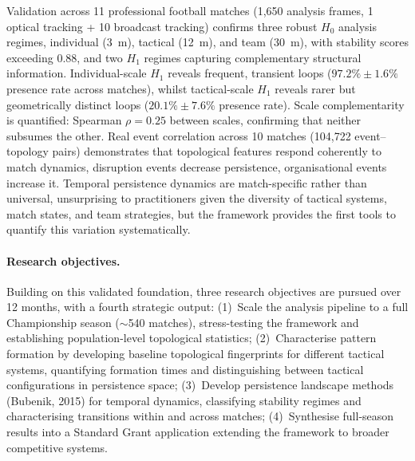 Validation across 11 professional football matches (1{,}650 analysis frames, 1 optical tracking + 10 broadcast tracking) confirms three robust $H_0$ analysis regimes, individual (3~m), tactical (12~m), and team (30~m), with stability scores exceeding 0.88, and two $H_1$ regimes capturing complementary structural information. Individual-scale $H_1$ reveals frequent, transient loops ($97.2\% \pm 1.6\%$ presence rate across matches), whilst tactical-scale $H_1$ reveals rarer but geometrically distinct loops ($20.1\% \pm 7.6\%$ presence rate). Scale complementarity is quantified: Spearman $\rho = 0.25$ between scales, confirming that neither subsumes the other. Real event correlation across 10 matches (104{,}722 event--topology pairs) demonstrates that topological features respond coherently to match dynamics, disruption events decrease persistence, organisational events increase it. Temporal persistence dynamics are match-specific rather than universal, unsurprising to practitioners given the diversity of tactical systems, match states, and team strategies, but the framework provides the first tools to quantify this variation systematically.

\paragraph{Research objectives.}
Building on this validated foundation, three research objectives are pursued over 12 months, with a fourth strategic output: (1)~Scale the analysis pipeline to a full Championship season ($\sim$540 matches), stress-testing the framework and establishing population-level topological statistics; (2)~Characterise pattern formation by developing baseline topological fingerprints for different tactical systems, quantifying formation times and distinguishing between tactical configurations in persistence space; (3)~Develop persistence landscape methods (Bubenik, 2015) for temporal dynamics, classifying stability regimes and characterising transitions within and across matches; (4)~Synthesise full-season results into a Standard Grant application extending the framework to broader competitive systems.

